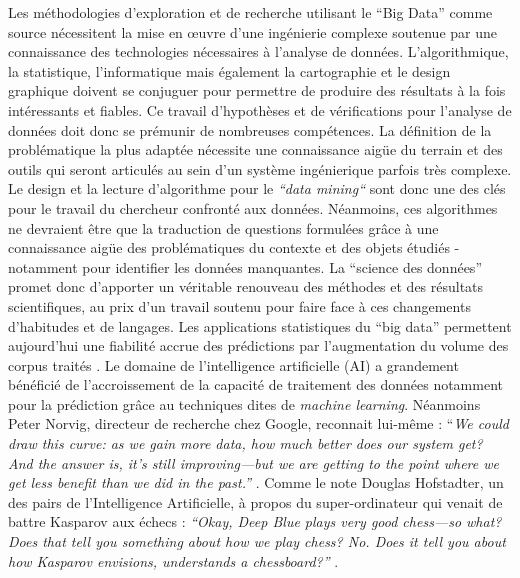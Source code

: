 Les méthodologies d{\textquoteright}exploration et de recherche utilisant le {\textquotedblleft}Big Data{\textquotedblright} comme source nécessitent la mise en {\oe}uvre d{\textquoteright}une ingénierie complexe soutenue par une connaissance des technologies nécessaires à l{\textquoteright}analyse de données. L{\textquoteright}algorithmique, la statistique, l{\textquoteright}informatique mais également la cartographie et le design graphique doivent se conjuguer pour permettre de produire des résultats à la fois intéressants et fiables. Ce travail d{\textquoteright}hypothèses et de vérifications pour l{\textquoteright}analyse de données doit donc se prémunir de nombreuses compétences. La définition de la problématique la plus adaptée nécessite une connaissance aig\"ue du terrain et des outils qui seront articulés au sein d{\textquoteright}un système ingénierique parfois très complexe. Le design et la lecture d{\textquoteright}algorithme pour le \textit{{\textquotedblleft}data mining{\textquotedblleft}} sont donc une des clés pour le travail du chercheur confronté aux données. Néanmoins, ces algorithmes ne devraient \^etre que la traduction de questions formulées gr\^ace à une connaissance aig\"ue des problématiques du contexte et des objets étudiés - notamment pour identifier les données manquantes. La {\textquotedblleft}science des données{\textquotedblright} promet donc d{\textquoteright}apporter un véritable renouveau des méthodes et des résultats scientifiques, au prix d{\textquoteright}un travail soutenu pour faire face à ces changements d{\textquoteright}habitudes et de langages. Les applications statistiques du {\textquotedblleft}big data{\textquotedblright} permettent aujourd{\textquoteright}hui une fiabilité accrue des prédictions par l{\textquoteright}augmentation du volume des corpus traités \citep{Breiman2001}. Le domaine de l{\textquoteright}intelligence artificielle (AI) a grandement bénéficié de l{\textquoteright}accroissement de la capacité de traitement des données notamment pour la prédiction gr\^ace au techniques dites de \textit{machine learning}. Néanmoins Peter Norvig, directeur de recherche chez Google, reconnait lui-m\^eme : {\textquotedblleft}\textit{We could draw this curve: as we gain more data, how much better does our system get? And the answer is, it{\textquoteright}s still improving---but we are getting to the point where we get less benefit than we did in the past.{\textquotedblright} }\citep{Somers2013}. Comme le note Douglas Hofstadter, un des pairs de l{\textquoteright}Intelligence Artificielle, à propos du super-ordinateur qui venait de battre Kasparov aux échecs : \textit{{\textquotedblleft}Okay, Deep Blue plays very good chess---so what? Does that tell you something about how we play chess? No. Does it tell you about how Kasparov envisions, understands a chessboard?{\textquotedblright} }\citep{Somers2013}.  

